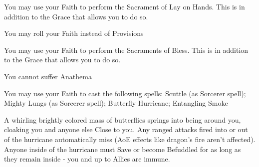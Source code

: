 {

You may use your Faith to perform the Sacrament of Lay on Hands.  This is in addition to the Grace that allows you to do so.




\GOD[
Name=Ishtar,
Link=small-god-ishtar,
GodOf=Lady of Fertility and Agriculture,
Holy=an eight pointed star usually worn as an amulet
]


You may roll your Faith instead of Provisions


You may use your Faith to perform the Sacraments of Bless.  This is in addition to the Grace that allows you to do so.




\GOD[
Name=Pilzesser,
Link=small-god-pilzesser,
GodOf=Seraph of Hallucinogenic Plants and Fungi,
Holy=a symbol of a pyramid with an eye at the top and the letters "FNORD" along its base.  Worn as a necklace or headband
]


You cannot suffer Anathema


You may use your Faith to cast the following spells: Scuttle (as Sorcerer spell); Mighty Lungs (as Sorcerer spell); Butterfly Hurricane; Entangling Smoke

\LITURGY [
  Name= Butterfly Hurricane,
  Link= pilzesser-liturgy-butterfly hurricane,
  Paradigm= Biomancy ,
  Save=  Y (negate) ,
  Duration= Combat or \SUMDICE Minutes ,
  Counter=  n/a  ,
  Keywords= None ,
  Target=   Self
]



A whirling brightly colored mass of butterflies springs into being around you, cloaking you and anyone else Close to you.  Any ranged attacks fired into or out of the hurricane automatically miss (AoE effects like dragon's fire aren't affected).  Anyone inside of the hurricane must Save or become Befuddled for as long as they remain inside - you and up to \DICE Allies are immune.

\LITURGY [
  Name= Entangling Smoke ,
  Link=pilzesser-liturgy-entangling-smoke ,
  Paradigm= Elements ,
  Save=  Y (negates) ,
  Duration= Markovian ,
  Counter=  n/a  ,
  Keywords= Splittable ,
  Target=   \DICE Close or Nearby objects or creatures
]



}
